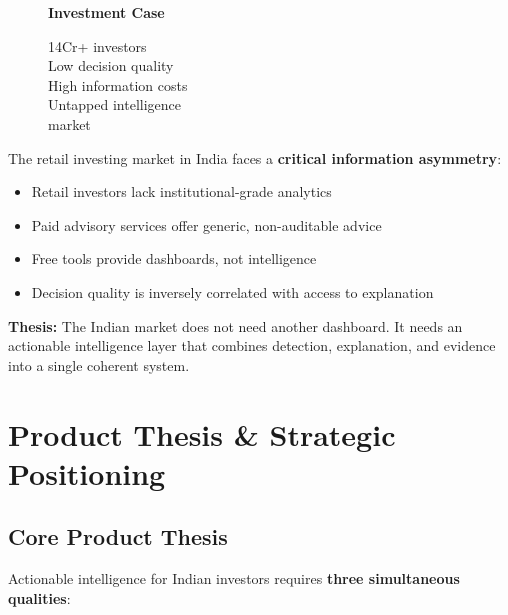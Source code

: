 \documentclass[11pt,a4paper]{article}
\newcommand{\highlight}[1]{\colorbox{mn-light}{\textcolor{mn-navy}{#1}}}
\begin{document}
\begin{figure}
    \vspace{-1cm}
    \begin{tcolorbox}[colback=mn-success!10, colframe=mn-success, arc=2mm, boxsep=10pt]
        \centering
        \textbf{\color{mn-navy}Investment Case}
        \par\vspace{0.5cm}
        {\small
        14Cr+ investors \\
        Low decision quality \\
        High information costs \\
        Untapped intelligence \\
        market}
    \end{tcolorbox}
\end{figure}

The retail investing market in India faces a \textbf{critical information asymmetry}:
\begin{itemize}
    \item Retail investors lack institutional-grade analytics
    \item Paid advisory services offer generic, non-auditable advice
    \item Free tools provide dashboards, not intelligence
    \item Decision quality is inversely correlated with access to explanation
\end{itemize}

\vspace{0.5cm}

\textbf{Thesis:} The Indian market does not need another dashboard. It needs an \highlight{actionable intelligence layer} that combines detection, explanation, and evidence into a single coherent system.

\section{Product Thesis \& Strategic Positioning}

\subsection{Core Product Thesis}

Actionable intelligence for Indian investors requires \textbf{three simultaneous qualities}:
\end{document}
